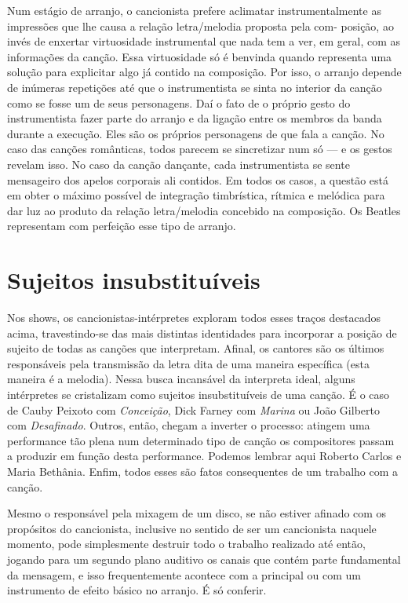 Num estágio de arranjo, o cancionista prefere aclimatar
instrumentalmente as impressões que lhe causa a relação letra/melodia
proposta pela com- posição, ao invés de enxertar virtuosidade
instrumental que nada tem a ver, em geral, com as informações da canção.
Essa virtuosidade só é benvinda quando representa uma solução para
explicitar algo já contido na composição. Por isso, o arranjo depende de
inúmeras repetições até que o instrumentista se sinta no interior da
canção como se fosse um de seus personagens. Daí o fato de o próprio
gesto do instrumentista fazer parte do arranjo e da ligação entre os
membros da banda durante a execução. Eles são os próprios personagens de
que fala a canção. No caso das canções românticas, todos parecem se
sincretizar num só --- e os gestos revelam isso. No caso da canção
dançante, cada instrumentista se sente mensageiro dos apelos corporais
ali contidos. Em todos os casos, a questão está em obter o máximo
possível de integração timbrística, rítmica e melódica para dar luz ao
produto da relação letra/melodia concebido na composição. Os Beatles
representam com perfeição esse tipo de arranjo.

\section{Sujeitos insubstituíveis}

Nos shows, os cancionistas-intérpretes exploram todos esses traços
destacados acima, travestindo-se das mais distintas identidades para
incorporar a posição de sujeito de todas as canções que interpretam.
Afinal, os cantores são os últimos responsáveis pela transmissão da
letra dita de uma maneira específica (esta maneira é a melodia). Nessa
busca incansável da interpreta ideal, alguns intérpretes se cristalizam
como sujeitos insubstituíveis de uma canção. É o caso de Cauby Peixoto
com \emph{Conceição}, Dick Farney com \emph{Marina} ou João Gilberto com
\emph{Desafinado}. Outros, então, chegam a inverter o processo: atingem
uma performance tão plena num determinado tipo de canção os compositores
passam a produzir em função desta performance. Podemos lembrar aqui
Roberto Carlos e Maria Bethânia. Enfim, todos esses são fatos
consequentes de um trabalho com a canção.

Mesmo o responsável pela mixagem de um disco, se não estiver afinado com
os propósitos do cancionista, inclusive no sentido de ser um cancionista
naquele momento, pode simplesmente destruir todo o trabalho realizado
até então, jogando para um segundo plano auditivo os canais que contém
parte fundamental da mensagem, e isso frequentemente acontece com a
principal ou com um instrumento de efeito básico no arranjo. É só
conferir.

